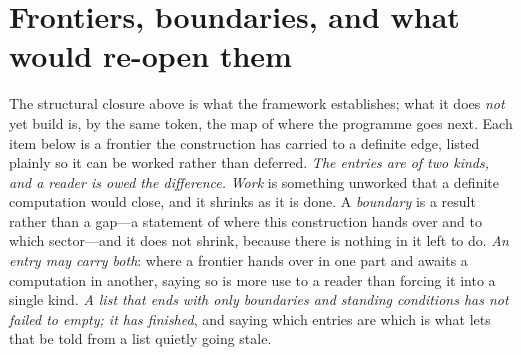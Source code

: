 \documentclass[11pt,a4paper]{article}
\theoremstyle{plain}
\theoremstyle{definition}
\theoremstyle{remark}
\begin{document}
\section{Frontiers, boundaries, and what would re-open them}\label{sec:frontiers}

The structural closure above is what the framework establishes; what it does \emph{not} yet build is, by the same token, the map of where the programme goes next. Each item below is a frontier the construction has carried to a definite edge, listed plainly so it can be worked rather than deferred. \emph{The entries are of two kinds, and a reader is owed the difference.}  \emph{Work} is something
unworked that a definite computation would close, and it shrinks as it is done.  A \emph{boundary} is a
result rather than a gap---a statement of where this construction hands over and to which sector---and it
does not shrink, because there is nothing in it left to do.  \emph{An entry may carry both}: where a frontier hands over in one part and awaits a computation in another, saying so is more use to a
reader than forcing it into a single kind.  \emph{A list that ends with only boundaries
and standing conditions has not failed to empty; it has finished}, and saying which entries are which is
what lets that be told from a list quietly going stale.
\end{document}
